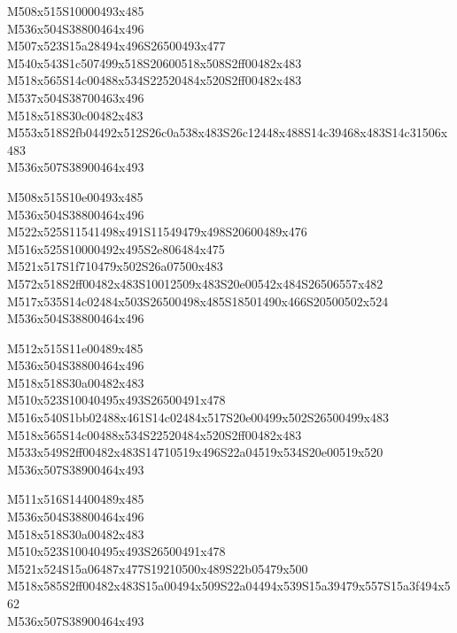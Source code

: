 \documentclass{article}
\begin{document}
\begin{multicols}{5}
\begin{center}

M508x515S10000493x485 %
\\M536x504S38800464x496 %
\\M507x523S15a28494x496S26500493x477 %
\\M540x543S1c507499x518S20600518x508S2ff00482x483 %
\\M518x565S14c00488x534S22520484x520S2ff00482x483 %
\\M537x504S38700463x496 %
\\M518x518S30c00482x483 %
\\M553x518S2fb04492x512S26c0a538x483S26c12448x488S14c39468x483S14c31506x483 %
\\M536x507S38900464x493 %
\vfil
\columnbreak

M508x515S10e00493x485 %
\\M536x504S38800464x496 %
\\M522x525S11541498x491S11549479x498S20600489x476 %
\\M516x525S10000492x495S2e806484x475 %
\\M521x517S1f710479x502S26a07500x483 %
\\M572x518S2ff00482x483S10012509x483S20e00542x484S26506557x482 %
\\M517x535S14c02484x503S26500498x485S18501490x466S20500502x524 %
\\M536x504S38800464x496 %
\vfil
\columnbreak

M512x515S11e00489x485 %
\\M536x504S38800464x496 %
\\M518x518S30a00482x483 %
\\M510x523S10040495x493S26500491x478 %
\\M516x540S1bb02488x461S14c02484x517S20e00499x502S26500499x483 %
\\M518x565S14c00488x534S22520484x520S2ff00482x483 %
\\M533x549S2ff00482x483S14710519x496S22a04519x534S20e00519x520 %
\\M536x507S38900464x493 %
\vfil
\columnbreak

M511x516S14400489x485 %
\\M536x504S38800464x496 %
\\M518x518S30a00482x483 %
\\M510x523S10040495x493S26500491x478 %
\\M521x524S15a06487x477S19210500x489S22b05479x500 %
\\M518x585S2ff00482x483S15a00494x509S22a04494x539S15a39479x557S15a3f494x562 %
\\M536x507S38900464x493 %
\vfil
\columnbreak


\end{center}
\end{multicols}
\end{document}
